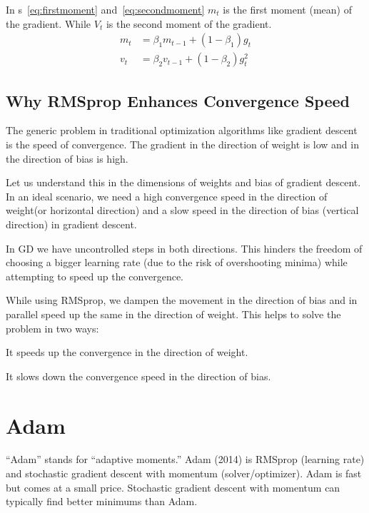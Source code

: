 In \equationname{}s~\ref{eq:firstmoment} and~\ref{eq:secondmoment} $m_t$ is the first moment (mean) of the gradient.  While $V_t$ is the second moment of the gradient.
	\begin{align}
		m_t &= \beta_1 m_{t-1} + \left( 1-\beta_1 \right) g_t   \label{eq:firstmoment} \\
		v_t &= \beta_2 v_{t-1} + \left( 1-\beta_2 \right) g_t^2 \label{eq:secondmoment}
	\end{align}

	\subsection{Why RMSprop Enhances Convergence Speed}
	\begin{bulletedlist}
		\item The generic problem in traditional optimization algorithms like gradient descent is the speed of convergence. The gradient in the direction of weight is low and in the direction of bias is high.
		\item Let us understand this in the dimensions of weights and bias of gradient descent.  In an ideal scenario, we need a high convergence speed in the direction of weight(or horizontal direction) and a slow speed in the direction of bias (vertical direction) in gradient descent.
		\item In GD we have uncontrolled steps in both directions.  This hinders the freedom of choosing a bigger learning rate (due to the risk of overshooting minima) while attempting to speed up the convergence.
		\item While using RMSprop, we dampen the movement in the direction of bias and in parallel speed up the same in the direction of weight.  This helps to solve the problem in two ways:
		\begin{bulletedlist}
			\item It speeds up the convergence in the direction of weight.
			\item It slows down the convergence speed in the direction of bias.
		\end{bulletedlist}
	\end{bulletedlist}

	\section{Adam}
``Adam'' stands for ``adaptive moments.''  Adam (2014) is RMSprop (learning rate) and stochastic gradient descent with momentum (solver/optimizer).  Adam is fast but comes at a small price. Stochastic gradient descent with momentum can typically find better minimums than Adam.

